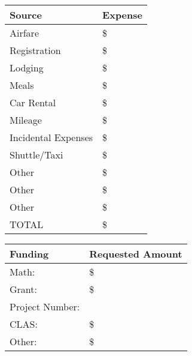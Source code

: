 \documentclass[•]{article}
\newcommand{\expenseTotal}{}
\newcommand{\mileage}{}
\newcommand{\mealTotal}{}
\newcommand{\expenseAirfare}{}
\newcommand{\expenseRegistration}{}
\newcommand{\expenseLodging}{}
\newcommand{\expenseCar}{}
\newcommand{\expenseIncidental}{}
\newcommand{\expenseTaxi}{}
\newcommand{\expenseOtherOne}{}
\newcommand{\expenseOtherTwo}{}
\newcommand{\expenseOtherThree}{}
\newcommand{\fundingMath}{}
\newcommand{\fundingGrant}{}
\newcommand{\fundingProject}{}
\newcommand{\fundingCLAS}{}
\newcommand{\fundingOther}{}
\newcommand{\fundingMath}{%
0
}
\newcommand{\fundingGrant}{%
0
}
\newcommand{\fundingProject}{%
/A
}
\newcommand{\fundingCLAS}{%
0
}
\newcommand{\fundingOther}{%
0
}
\newcommand{\expenseAirfare}{%
0
}
\newcommand{\expenseRegistration}{%
40
}
\newcommand{\expenseLodging}{%
300
}
\newcommand{\expenseCar}{%
0
}
\newcommand{\expenseIncidental}{%
0
}
\newcommand{\expenseTaxi}{%
50
}
\newcommand{\expenseOtherOne}{%
0
}
\newcommand{\expenseOtherTwo}{%
0
}
\newcommand{\expenseOtherThree}{%
0
}
\begin{document}
\begin{center}
  \begin{tabular}{ | l | l | }
\hline

Source & Expense \\ \hline

Airfare & \$ \expenseAirfare \\ \hline

Registration & \$ \expenseRegistration \\ \hline

Lodging & \$ \expenseLodging \\ \hline

Meals & \$ 	\mealTotal %
\\ \hline

Car Rental & \$ \expenseCar
\\ \hline

Mileage & \$ \mileage
\\ \hline

Incidental Expenses & \$ \expenseIncidental \\ \hline

Shuttle/Taxi & \$ \expenseTaxi \\ \hline

Other & \$ \expenseOtherOne \\ \hline

Other & \$ \expenseOtherTwo \\ \hline

Other & \$ \expenseOtherThree \\ \hline

TOTAL & \$ \expenseTotal \\ \hline
  \end{tabular}
  \begin{tabular}{| l | l |}
  \hline
Funding & Requested Amount\\  \hline

Math: & \$ \fundingMath \\ \hline

Grant: & \$ \fundingGrant  \\ \hline

Project Number: & \fundingProject   \\ \hline

CLAS: & \$ \fundingCLAS   \\ \hline

Other: & \$ \fundingOther  \\ \hline

  \end{tabular}
\end{center}
\end{document}
